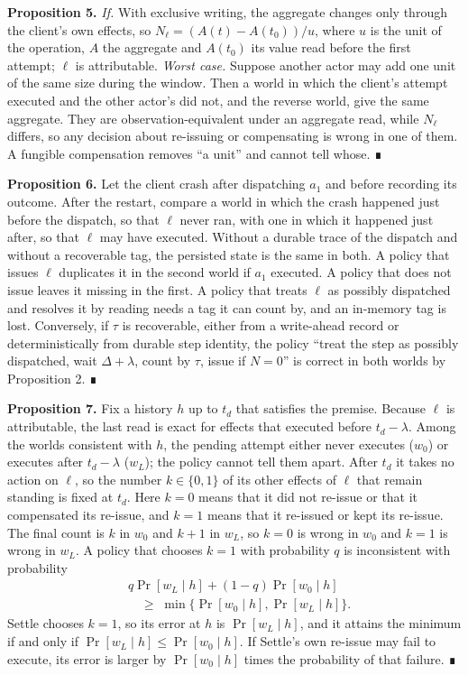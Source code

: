 \documentclass[
  10pt,
]{article}
\begin{document}
\textbf{Proposition 5.} \emph{If.} With exclusive writing, the aggregate
changes only through the client's own effects, so
\(N_\ell = (A(t) - A(t_0))/u\), where \(u\) is the unit of the
operation, \(A\) the aggregate and \(A(t_0)\) its value read before the
first attempt; \(\ell\) is attributable. \emph{Worst case.} Suppose
another actor may add one unit of the same size during the window. Then
a world in which the client's attempt executed and the other actor's did
not, and the reverse world, give the same aggregate. They are
observation-equivalent under an aggregate read, while \(N_\ell\)
differs, so any decision about re-issuing or compensating is wrong in
one of them. A fungible compensation removes ``a unit'' and cannot tell
whose. ∎

\textbf{Proposition 6.} Let the client crash after dispatching \(a_1\)
and before recording its outcome. After the restart, compare a world in
which the crash happened just before the dispatch, so that \(\ell\)
never ran, with one in which it happened just after, so that \(\ell\)
may have executed. Without a durable trace of the dispatch and without a
recoverable tag, the persisted state is the same in both. A policy that
issues \(\ell\) duplicates it in the second world if \(a_1\) executed. A
policy that does not issue leaves it missing in the first. A policy that
treats \(\ell\) as possibly dispatched and resolves it by reading needs
a tag it can count by, and an in-memory tag is lost. Conversely, if
\(\tau\) is recoverable, either from a write-ahead record or
deterministically from durable step identity, the policy ``treat the
step as possibly dispatched, wait \(\Delta + \lambda\), count by
\(\tau\), issue if \(N = 0\)'' is correct in both worlds by Proposition
2. ∎

\textbf{Proposition 7.} Fix a history \(h\) up to \(t_d\) that satisfies
the premise. Because \(\ell\) is attributable, the last read is exact
for effects that executed before \(t_d - \lambda\). Among the worlds
consistent with \(h\), the pending attempt either never executes
(\(w_0\)) or executes after \(t_d - \lambda\) (\(w_L\)); the policy
cannot tell them apart. After \(t_d\) it takes no action on \(\ell\), so
the number \(k \in \{0, 1\}\) of its other effects of \(\ell\) that
remain standing is fixed at \(t_d\). Here \(k = 0\) means that it did
not re-issue or that it compensated its re-issue, and \(k = 1\) means
that it re-issued or kept its re-issue. The final count is \(k\) in
\(w_0\) and \(k + 1\) in \(w_L\), so \(k = 0\) is wrong in \(w_0\) and
\(k = 1\) is wrong in \(w_L\). A policy that chooses \(k = 1\) with
probability \(q\) is inconsistent with probability
\[\begin{aligned} &q\Pr[w_L \mid h] + (1 - q)\Pr[w_0 \mid h] \\ &\quad\ge\; \min\{\Pr[w_0 \mid h], \Pr[w_L \mid h]\}. \end{aligned}\]
Settle chooses \(k = 1\), so its error at \(h\) is \(\Pr[w_L \mid h]\),
and it attains the minimum if and only if
\(\Pr[w_L \mid h] \le \Pr[w_0 \mid h]\). If Settle's own re-issue may
fail to execute, its error is larger by \(\Pr[w_0 \mid h]\) times the
probability of that failure. ∎
\end{document}
